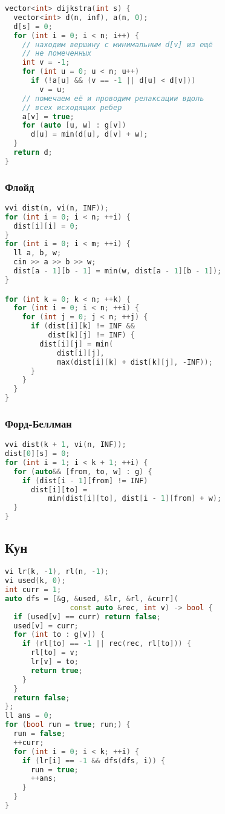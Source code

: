\documentclass[10pt,a4paper,landscape,twosided]{extarticle}
\begin{document}
\begin{multicols}{3}
\begin{lstlisting}[language=C++]
vector<int> dijkstra(int s) {
  vector<int> d(n, inf), a(n, 0);
  d[s] = 0;
  for (int i = 0; i < n; i++) {
    // находим вершину с минимальным d[v] из ещё
    // не помеченных
    int v = -1;
    for (int u = 0; u < n; u++)
      if (!a[u] && (v == -1 || d[u] < d[v]))
        v = u;
    // помечаем её и проводим релаксации вдоль
    // всех исходящих ребер
    a[v] = true;
    for (auto [u, w] : g[v])
      d[u] = min(d[u], d[v] + w);
  }
  return d;
}
\end{lstlisting}

\subsubsection{Флойд}
\begin{lstlisting}[language=C++]
vvi dist(n, vi(n, INF));
for (int i = 0; i < n; ++i) {
  dist[i][i] = 0;
}
for (int i = 0; i < m; ++i) {
  ll a, b, w;
  cin >> a >> b >> w;
  dist[a - 1][b - 1] = min(w, dist[a - 1][b - 1]);
}

for (int k = 0; k < n; ++k) {
  for (int i = 0; i < n; ++i) {
    for (int j = 0; j < n; ++j) {
      if (dist[i][k] != INF &&
          dist[k][j] != INF) {
        dist[i][j] = min(
            dist[i][j],
            max(dist[i][k] + dist[k][j], -INF));
      }
    }
  }
}
\end{lstlisting}

\subsubsection{Форд-Беллман}
\begin{lstlisting}[language=C++]
vvi dist(k + 1, vi(n, INF));
dist[0][s] = 0;
for (int i = 1; i < k + 1; ++i) {
  for (auto&& [from, to, w] : g) {
    if (dist[i - 1][from] != INF)
      dist[i][to] =
          min(dist[i][to], dist[i - 1][from] + w);
  }
}
\end{lstlisting}

\subsection{Кун}
\begin{lstlisting}[language=C++]
vi lr(k, -1), rl(n, -1);
vi used(k, 0);
int curr = 1;
auto dfs = [&g, &used, &lr, &rl, &curr](
               const auto &rec, int v) -> bool {
  if (used[v] == curr) return false;
  used[v] = curr;
  for (int to : g[v]) {
    if (rl[to] == -1 || rec(rec, rl[to])) {
      rl[to] = v;
      lr[v] = to;
      return true;
    }
  }
  return false;
};
ll ans = 0;
for (bool run = true; run;) {
  run = false;
  ++curr;
  for (int i = 0; i < k; ++i) {
    if (lr[i] == -1 && dfs(dfs, i)) {
      run = true;
      ++ans;
    }
  }
}
\end{lstlisting}


\end{multicols}
\end{document}
